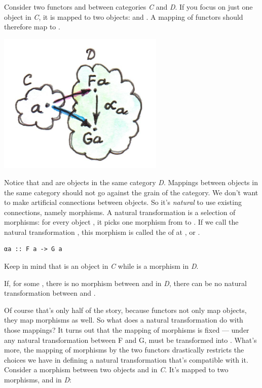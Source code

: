 Consider two functors  and  between categories
\emph{C} and \emph{D}. If you focus on just one object  in
\emph{C}, it is mapped to two objects:  and .
A mapping of functors should therefore map  to
.

\includegraphics[width=3.12500in]{images/2_natcomp.jpg}

Notice that  and  are objects in the same
category \emph{D}. Mappings between objects in the same category should
not go against the grain of the category. We don't want to make
artificial connections between objects. So it's \emph{natural} to use
existing connections, namely morphisms. A natural transformation is a
selection of morphisms: for every object , it picks one
morphism from  to . If we call the natural
transformation , this morphism is called the 
of  at , or .

\begin{verbatim}
αa :: F a -> G a
\end{verbatim}

Keep in mind that  is an object in \emph{C} while 
is a morphism in \emph{D}.

If, for some , there is no morphism between  and
 in \emph{D}, there can be no natural transformation
between  and .

Of course that's only half of the story, because functors not only map
objects, they map morphisms as well. So what does a natural
transformation do with those mappings? It turns out that the mapping of
morphisms is fixed --- under any natural transformation between F and G,
 must be transformed into . What's more, the
mapping of morphisms by the two functors drastically restricts the
choices we have in defining a natural transformation that's compatible
with it. Consider a morphism  between two objects 
and  in \emph{C}. It's mapped to two morphisms, 
and  in \emph{D}:

